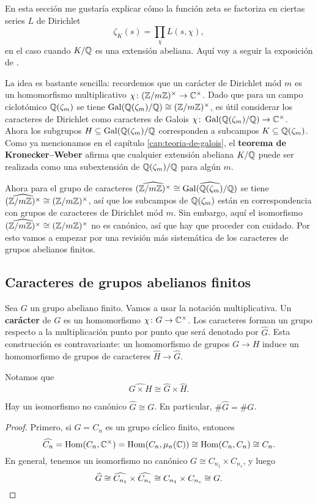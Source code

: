 En esta sección me gustaría explicar cómo la función zeta se factoriza en
ciertas series $L$ de Dirichlet
$$\zeta_K (s) = \prod_\chi L(s,\chi),$$
en el caso cuando $K/\mathbb{Q}$ es una extensión abeliana. Aquí voy a seguir la
exposición de \cite{Washington-GTM83}.

La idea es bastante sencilla: recordemos que un carácter de Dirichlet mód $m$
es un homomorfismo multiplicativo
$\chi\colon (\mathbb{Z}/m\mathbb{Z})^\times \to \mathbb{C}^\times$. Dado que para un campo ciclotómico
$\mathbb{Q} (\zeta_m)$ se tiene $\operatorname{Gal} (\mathbb{Q}(\zeta_m)/\mathbb{Q}) \cong (\mathbb{Z}/m\mathbb{Z})^\times$,
es útil considerar los caracteres de Dirichlet como caracteres de Galois
$\chi\colon \operatorname{Gal} (\mathbb{Q}(\zeta_m)/\mathbb{Q}) \to \mathbb{C}^\times$. Ahora los subgrupos
$H \subseteq \operatorname{Gal} (\mathbb{Q}(\zeta_m)/\mathbb{Q}$ corresponden a subcampos
$K \subseteq \mathbb{Q} (\zeta_m)$. Como ya mencionamos en el capítulo
\ref{cap:teoria-de-galois}, el \textbf{teorema de Kronecker--Weber} afirma que
cualquier extensión abeliana $K/\mathbb{Q}$ puede ser realizada como una subextensión
de $\mathbb{Q} (\zeta_m)/\mathbb{Q}$ para algún $m$.

Ahora para el grupo de caracteres
$\widehat{(\mathbb{Z}/m\mathbb{Z})^\times} \cong \widehat{\operatorname{Gal} (\mathbb{Q}(\zeta_m)/\mathbb{Q})}$ se tiene
$\widehat{(\mathbb{Z}/m\mathbb{Z})^\times} \cong (\mathbb{Z}/m\mathbb{Z})^\times$, así que los subcampos
de $\mathbb{Q} (\zeta_m)$ están en correspondencia con grupos de caracteres de
Dirichlet mód $m$. Sin embargo, aquí el isomorfismo
$\widehat{(\mathbb{Z}/m\mathbb{Z})^\times} \cong (\mathbb{Z}/m\mathbb{Z})^\times$ no es canónico, así que
hay que proceder con cuidado. Por esto vamos a empezar por una revisión más
sistemática de los caracteres de grupos abelianos finitos.


\subsection{Caracteres de grupos abelianos finitos}

Sea $G$ un grupo abeliano finito. Vamos a usar la notación multiplicativa.
Un \textbf{carácter} de $G$ es un homomorfismo $\chi\colon G\to \mathbb{C}^\times$.
Los caracteres forman un grupo respecto a la multiplicación punto por punto
que será denotado por $\widehat{G}$. Esta construcción es contravariante:
un homomorfismo de grupos $G\to H$ induce un homomorfismo de grupos de
caracteres $\widehat{H} \to \widehat{G}$.

Notamos que
$$\widehat{G\times H} \cong \widehat{G}\times\widehat{H}.$$

\begin{lema}
  Hay un isomorfismo no canónico $\widehat{G} \cong G$. En particular,
  $\#\widehat{G} = \# G$.

  \begin{proof}
    Primero, si $G = C_n$ es un grupo cíclico finito, entonces
    \[ \widehat{C_n} = \operatorname{Hom} (C_n, \mathbb{C}^\times) = \operatorname{Hom} (C_n, \mu_n (\mathbb{C})) \cong
    \operatorname{Hom} (C_n,C_n) \cong C_n. \]
    En general, tenemos un isomorfismo no canónico
    $G \cong C_{n_1}\times C_{n_s}$, y luego
    \[ \widehat{G} \cong \widehat{C_{n_1}}\times \widehat{C_{n_s}} \cong
       C_{n_1}\times C_{n_s} \cong G. \qedhere \]
  \end{proof}
\end{lema}

